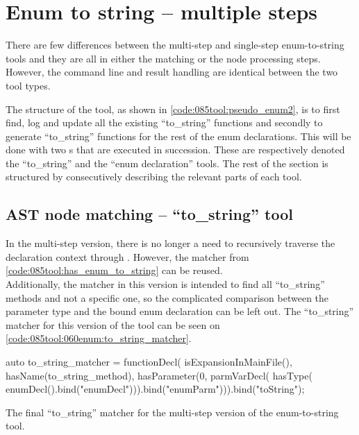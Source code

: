 \section{Enum to string -- multiple steps}\label{sec:085dev:060en_mul:mul_step}

There are few differences between the multi-step and single-step enum-to-string tools and they are all in either the matching or the node processing steps. However, the command line and result handling are identical between the two tool types.

The structure of the tool, as shown in \cref{code:085tool:pseudo_enum2}, is to first find, log and update all the existing ``to\_string'' functions and secondly to generate ``to\_string'' functions for the rest of the enum declarations.
This will be done with two s that are executed in succession. These are respectively denoted the ``to\_string'' and the ``enum declaration'' tools. The rest of the section is structured by consecutively describing the relevant parts of each tool.

\subsection{AST node matching -- ``to\_string'' tool}
In the multi-step version, there is no longer a need to recursively traverse the declaration context through .
However, the  matcher from \cref{code:085tool:has_enum_to_string} can be reused.\\
Additionally, the matcher in this version is intended to find all ``to\_string'' methods and not a specific one, so the complicated comparison between the parameter type and the bound enum declaration can be left out.
The ``to\_string'' matcher for this version of the tool can be seen on \cref{code:085tool:060enum:to_string_matcher}.

\begin{listing}[H]
    \begin{cppcode}
auto to_string_matcher = functionDecl(
  isExpansionInMainFile(),
  hasName(to_string_method),
  hasParameter(0, 
    parmVarDecl(
	  hasType(
	    enumDecl().bind("enumDecl"))).bind("enumParm"))).bind("toString");
    \end{cppcode}
    \caption{The final ``to\_string'' matcher for the multi-step version of the enum-to-string tool.}
    \label{code:085tool:060enum:to_string_matcher}
\end{listing}

